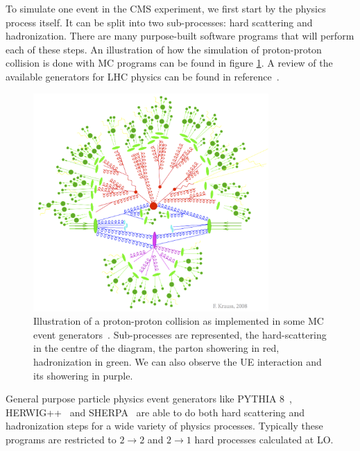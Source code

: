 
To simulate one event in the \gls{CMS} experiment, we first start by the physics process itself. It can be split into two sub-processes: hard scattering and hadronization. There are many purpose-built software programs that will perform each of these steps. An illustration of how the simulation of proton-proton collision is done with \gls{MC} programs can be found in figure \ref{FIGURE:EventReconstructionAndSimulation_MCShower}. A review of the available generators for \gls{LHC} physics can be found in reference~\cite{ARTICLE:GeneralPurposeEventGeneratorsForLHCPhysics}.

\begin{figure}[!htb]
\centering
\includegraphics[width=0.8\textwidth]{Chapter04/MonteCarlo/Images/MCShower.png}
\caption[Illustration a proton-proton collision as implemented in MC event generators.]
{Illustration of a proton-proton collision as implemented in some MC event generators~\cite{IMAGEREF:krauss-diag}. Sub-processes are represented, the hard-scattering in the centre of the diagram, the parton showering in red, hadronization in green. We can also observe the \gls{UE} interaction and its showering in purple.}
\label{FIGURE:EventReconstructionAndSimulation_MCShower}
\end{figure}

General purpose particle physics event generators like \textsc{PYTHIA 8}~\cite{ARTICLE:Pythia6p4PhysicsAndManual,ARTICLE:Pythia8p1Introduction}, \textsc{HERWIG++}~\cite{ARTICLE:HERWIGPhysicsAndManual} and \textsc{SHERPA}~\cite{ARTiCLE:SherpaEventGenerator} are able to do both hard scattering and hadronization steps for a wide variety of physics processes. Typically these programs are restricted to $2 \rightarrow 2$ and $2 \rightarrow 1$ hard processes calculated at \gls{LO}.

